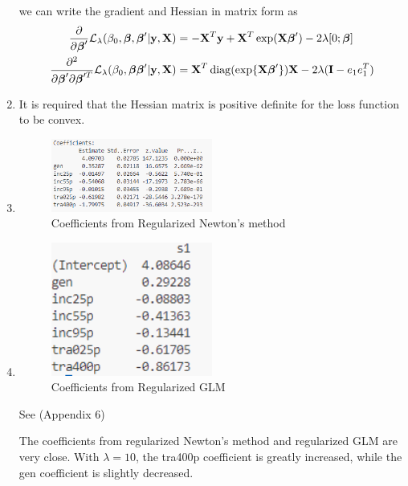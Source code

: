 \documentclass{article}
\newcommand{\vect}[1]{\boldsymbol{#1}}
\newcommand{\vectrm}[1]{\boldsymbol{\rm #1}}
\DeclareMathOperator{\diag}{diag}
\begin{document}
\begin{enumerate}[label=(\alph*)]
  we can write the gradient and Hessian in matrix form as
  \begin{align*}
    \frac{\partial}{\partial \vect \beta'} \mathcal L_\lambda(\beta_0, \vect \beta, \vect \beta' | \vectrm y, \vectrm X) &= -\vectrm X^T \vectrm y
+ \vectrm X^T \exp(\vectrm X \vect \beta') - 2\lambda [0;\vect \beta] \\
    \frac{\partial^2}{\partial \vect \beta' \partial \vect \beta'^T} \mathcal L_\lambda(\beta_0, \vect \beta \vect \beta'| \vectrm y, \vectrm X) &= \vectrm X^T \diag(\exp \{\vectrm X \vect \beta'\}) \vectrm X - 2\lambda (\vectrm I - e_1e_1^T)
  \end{align*}

\item It is required that the Hessian matrix is positive definite for the loss function to be convex.
\item 
\newpage
\begin{figure}[h]
    \centering
    \includegraphics[width=0.5\textwidth]{6c.png}
    \caption{Coefficients from Regularized Newton's method}
\end{figure}
\item 
\begin{figure}[h]
    \centering
    \includegraphics[width=0.5\textwidth]{6d.png}
    \caption{Coefficients from Regularized GLM}
\end{figure}

See (Appendix 6)

The coefficients from regularized Newton's method and regularized GLM are very close.
With \(\lambda = 10\), the tra400p coefficient is greatly increased, while the gen coefficient is slightly decreased. 

\end{enumerate}
\end{document}
